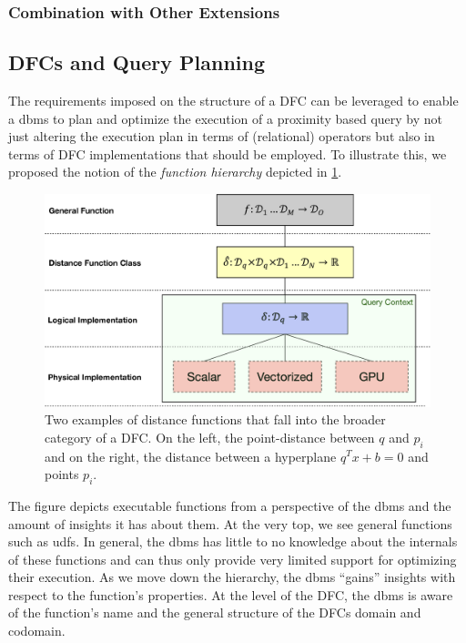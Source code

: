 
\subsubsection{Combination with Other Extensions}


\subsection{DFCs and Query Planning}
\label{section:dfc_and_planning}

The requirements imposed on the structure of a DFC can be leveraged to enable a \acrshort{dbms} to plan and optimize the execution of a proximity based query by not just altering the execution plan in terms of (relational) operators but also in terms of DFC implementations that should be employed. To illustrate this, we proposed the notion of the \emph{function hierarchy} depicted in \ref{figure:function_hierarchy}.

\begin{figure}[bt]
    \centering
    \includegraphics[width=\textwidth]{figures/function_hierarchy.eps}
    \caption{Two examples of distance functions that fall into the broader category of a DFC. On the left, the point-distance between $q$ and $p_i$ and on the right, the distance between a hyperplane $q^Tx+b = 0$ and points $p_i$.}
    \label{figure:function_hierarchy}
\end{figure}

The figure depicts executable functions from a perspective of the \acrshort{dbms} and the amount of insights it has about them. At the very top, we see general functions such as \acrshort{udf}s. In general, the \acrshort{dbms} has little to no knowledge about the internals of these functions and can thus only provide very limited support for optimizing their execution. As we move down the hierarchy, the \acrshort{dbms} ``gains'' insights with respect to the function's properties. At the level of the \acrshort{DFC}, the \acrshort{dbms} is aware of the function's name and the general structure of the DFCs domain and codomain. 


